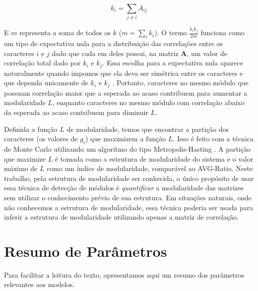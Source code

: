 \begin{equation}
   k_i = \sum_{j \neq i} A_{ij}
\end{equation}

E $m$ representa a soma de todos os $k$ ($m=\sum_i k_i$).
O termo $\frac{k_ik_j}{2m}$ funciona como um tipo de expectativa nula
para a distribuição das correlações entre os caracteres $i$ e $j$ dado que
cada em deles possui, na matriz $\mathbf{A}$, um valor de correlação total
dado por $k_i$ e $k_j$.
Essa escolha para a expectativa nula aparece naturalmente quando
impomos que ela deva ser simétrica entre os caracteres e que dependa
unicamente de $k_i$ e $k_j$ \citep[Para detalhes veja][]{Newman2006a}.
Portanto, caracteres no mesmo módulo que possuam correlação maior que a
esperada ao acaso contribuem para aumentar a modularidade $L$, enquanto
caracteres no mesmo módulo com correlação abaixo da esperada ao acaso
contribuem para diminuir $L$.

Definida a função $L$ de modularidade, temos que encontrar a partição
dos caracteres (os valores de $g_i$) que maximizem a função $L$.
Isso é feito com a técnica de Monte Carlo utilizando um algoritmo
do tipo Metropolis-Hasting \citep{Metropolis1953}.
A partição que maximize $L$ é tomada como a estrutura de modularidade do
sistema e o valor máximo de $L$ como um índice de modularidade,
comparável ao AVG-Ratio.
Neste trabalho, pela estrutura de modularidade ser conhecida, o único propósito 
de usar essa técnica de detecção de módulos é {\it quantificar} a 
modularidade das matrizes sem utilizar o conhecimento prévio de sua
estrutura.
Em situações naturais, onde não conhecemos a estrutura de modularidade,
essa técnica poderia ser usada para inferir a estrutura de modularidade
utilizando apenas a matriz de correlação.

\section{Resumo de Parâmetros}

Para facilitar a leitura do texto, apresentamos aqui um resumo dos
parâmetros relevantes aos modelos.

